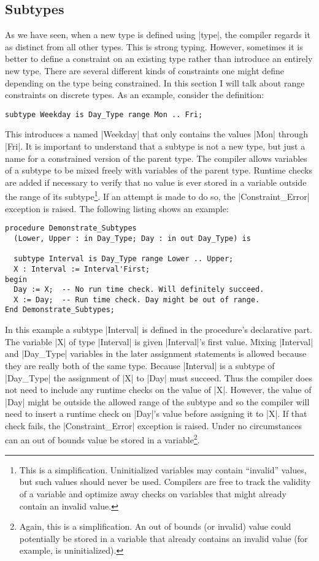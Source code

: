 \subsection{Subtypes}

As we have seen, when a new type is defined using |type|, the compiler regards it as distinct
from all other types. This is strong typing. However, sometimes it is better to define a
constraint on an existing type rather than introduce an entirely new type. There are several
different kinds of constraints one might define depending on the type being constrained. In this
section I will talk about range constraints on discrete types. As an example, consider the
definition:

\begin{lstlisting}
subtype Weekday is Day_Type range Mon .. Fri;
\end{lstlisting}

\noindent This introduces a  named |Weekday| that only contains the values
|Mon| through |Fri|. It is important to understand that a subtype is not a new type, but just a
name for a constrained version of the parent type. The compiler allows variables of a subtype to
be mixed freely with variables of the parent type. Runtime checks are added if necessary to
verify that no value is ever stored in a variable outside the range of its subtype\footnote{This
  is a simplification. Uninitialized variables may contain ``invalid'' values, but such values
  should never be used. Compilers are free to track the validity of a variable and optimize away
  checks on variables that might already contain an invalid value.}. If an attempt is made to do
so, the |Constraint_Error| exception is raised. The following listing shows an example:

\begin{lstlisting}
procedure Demonstrate_Subtypes
  (Lower, Upper : in Day_Type; Day : in out Day_Type) is

  subtype Interval is Day_Type range Lower .. Upper;
  X : Interval := Interval'First;
begin
  Day := X;  -- No run time check. Will definitely succeed.
  X := Day;  -- Run time check. Day might be out of range.
End Demonstrate_Subtypes;
\end{lstlisting}

In this example a subtype |Interval| is defined in the procedure's declarative part. The
variable |X| of type |Interval| is given |Interval|'s first value. Mixing |Interval| and
|Day_Type| variables in the later assignment statements is allowed because they are really both
of the same type. Because |Interval| is a subtype of |Day_Type| the assignment of |X| to |Day|
must succeed. Thus the compiler does not need to include any runtime checks on the value of |X|.
However, the value of |Day| might be outside the allowed range of the subtype and so the
compiler will need to insert a runtime check on |Day|'s value before assigning it to |X|. If
that check fails, the |Constraint_Error| exception is raised. Under no circumstances can an out
of bounds value be stored in a variable\footnote{Again, this is a simplification. An out of
  bounds (or invalid) value could potentially be stored in a variable that already contains an
  invalid value (for example, is uninitialized).}.


